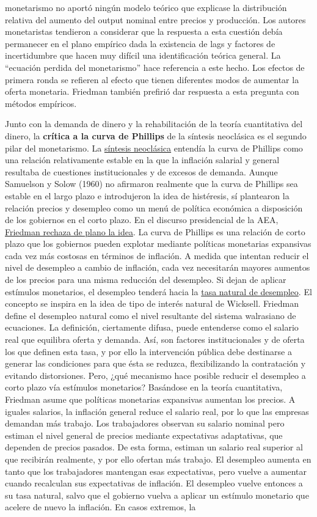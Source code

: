 \documentclass{nuevotema}
\begin{document}
monetarismo no aportó ningún modelo teórico que explicase la distribución relativa del aumento del output nominal entre precios y producción. Los autores monetaristas tendieron a considerar que la respuesta a esta cuestión debía permanecer en el plano empírico dada la existencia de lags y factores de incertidumbre que hacen muy difícil una identificación teórica general. La ``ecuación perdida del monetarismo'' hace referencia a este hecho. Los efectos de primera ronda se refieren al efecto que tienen diferentes modos de aumentar la oferta monetaria. Friedman también prefirió dar respuesta a esta pregunta con métodos empíricos.

Junto con la demanda de dinero y la rehabilitación de la teoría cuantitativa del dinero, la \textbf{crítica a la curva de Phillips} de la síntesis neoclásica es el segundo pilar del monetarismo. La \underline{síntesis neoclásica} entendía la curva de Phillips como una relación relativamente estable en la que la inflación salarial y general resultaba de cuestiones institucionales y de excesos de demanda. Aunque Samuelson y Solow (1960) no afirmaron realmente que la curva de Phillips sea estable en el largo plazo e introdujeron la idea de histéresis, sí plantearon la relación precios y desempleo como un menú de política económica a disposición de los gobiernos en el corto plazo. En el discurso presidencial de la AEA, \underline{Friedman rechaza de plano la idea}. La curva de Phillips es una relación de corto plazo que los gobiernos pueden explotar mediante políticas monetarias expansivas cada vez más costosas en términos de inflación. A medida que intentan reducir el nivel de desempleo a cambio de inflación, cada vez necesitarán mayores aumentos de los precios para una misma reducción del desempleo. Si dejan de aplicar estímulos monetarios, el desempleo tenderá hacia la \underline{tasa natural de desempleo}. El concepto se inspira en la idea de tipo de interés natural de Wicksell. Friedman define el desempleo natural como el nivel resultante del sistema walrasiano de ecuaciones. La definición, ciertamente difusa, puede entenderse como el salario real que equilibra oferta y demanda. Así, son factores institucionales y de oferta los que definen esta tasa, y por ello la intervención pública debe destinarse a generar las condiciones para que ésta se reduzca, flexibilizando la contratación y evitando distorsiones. Pero, ¿qué mecanismo hace posible reducir el desempleo a corto plazo vía estímulos monetarios? Basándose en la teoría cuantitativa, Friedman asume que políticas monetarias expansivas aumentan los precios. A iguales salarios, la inflación general reduce el salario real, por lo que las empresas demandan más trabajo. Los trabajadores observan su salario nominal pero estiman el nivel general de precios mediante expectativas adaptativas, que dependen de precios pasados. De esta forma, estiman un salario real superior al que recibirán realmente, y por ello ofertan más trabajo. El desempleo aumenta en tanto que los trabajadores mantengan esas expectativas, pero vuelve a aumentar cuando recalculan sus expectativas de inflación. El desempleo vuelve entonces a su tasa natural, salvo que el gobierno vuelva a aplicar un estímulo monetario que acelere de nuevo la inflación. En casos extremos, la 
\end{document}
